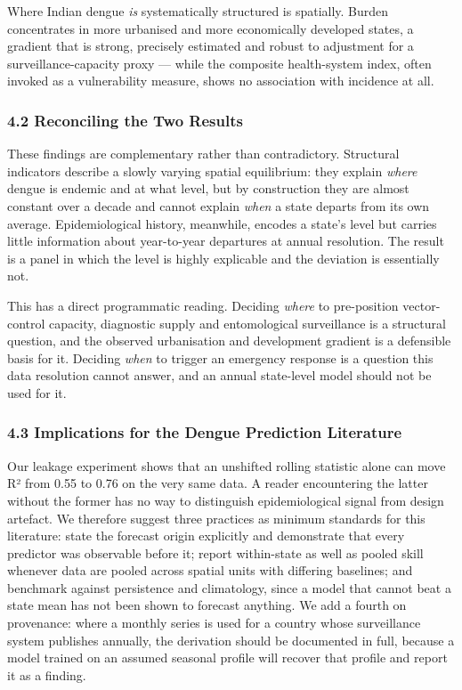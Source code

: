 \documentclass[
  10pt,
  twocolumn]{article}
\begin{document}
Where Indian dengue \emph{is} systematically structured is spatially.
Burden concentrates in more urbanised and more economically developed
states, a gradient that is strong, precisely estimated and robust to
adjustment for a surveillance-capacity proxy --- while the composite
health-system index, often invoked as a vulnerability measure, shows no
association with incidence at all.

\subsubsection{4.2 Reconciling the Two
Results}\label{reconciling-the-two-results}

These findings are complementary rather than contradictory. Structural
indicators describe a slowly varying spatial equilibrium: they explain
\emph{where} dengue is endemic and at what level, but by construction
they are almost constant over a decade and cannot explain \emph{when} a
state departs from its own average. Epidemiological history, meanwhile,
encodes a state's level but carries little information about
year-to-year departures at annual resolution. The result is a panel in
which the level is highly explicable and the deviation is essentially
not.

This has a direct programmatic reading. Deciding \emph{where} to
pre-position vector-control capacity, diagnostic supply and
entomological surveillance is a structural question, and the observed
urbanisation and development gradient is a defensible basis for it.
Deciding \emph{when} to trigger an emergency response is a question this
data resolution cannot answer, and an annual state-level model should
not be used for it.

\subsubsection{4.3 Implications for the Dengue Prediction
Literature}\label{implications-for-the-dengue-prediction-literature}

Our leakage experiment shows that an unshifted rolling statistic alone
can move R² from 0.55 to 0.76 on the very same data. A reader
encountering the latter without the former has no way to distinguish
epidemiological signal from design artefact. We therefore suggest three
practices as minimum standards for this literature: state the forecast
origin explicitly and demonstrate that every predictor was observable
before it; report within-state as well as pooled skill whenever data are
pooled across spatial units with differing baselines; and benchmark
against persistence and climatology, since a model that cannot beat a
state mean has not been shown to forecast anything. We add a fourth on
provenance: where a monthly series is used for a country whose
surveillance system publishes annually, the derivation should be
documented in full, because a model trained on an assumed seasonal
profile will recover that profile and report it as a finding.
\end{document}
